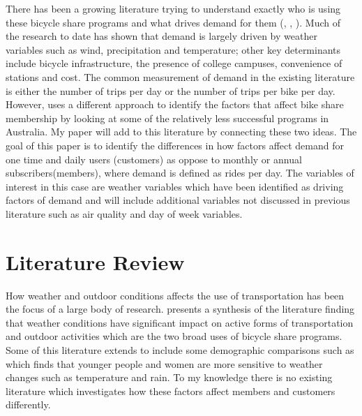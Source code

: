 \documentclass[12pt,letter paper]{article}
\begin{document}
There has been a growing literature trying to understand exactly who is using these bicycle share programs and what drives demand for them (\cite{fishman2013bike}, \cite{el2017effects}, \cite{mattson2017bike}).  Much of the research to date has shown that demand is largely driven by weather variables such as wind, precipitation and temperature; other key determinants include bicycle infrastructure, the presence of college campuses, convenience of stations and cost.  The common measurement of demand in the existing literature is either the number of trips per day or the number of trips per bike per day.  However, \cite{fishman2015factors} uses a different approach to identify the factors that affect bike share membership by looking at some of the relatively less successful programs in Australia.  My paper will add to this literature by connecting these two ideas.  The goal of this paper is to identify the differences in how factors affect demand for one time and daily users (customers) as oppose to monthly or annual subscribers(members), where demand is defined as rides per day.  The variables of interest in this case are weather variables which have been identified as driving factors of demand and will include additional variables not discussed in previous literature such as air quality and day of week variables.  \\





\section{Literature Review}

How weather and outdoor conditions affects the use of transportation has been the focus of a large body of research.  \cite{bocker2013impact} presents a synthesis of the literature finding that weather conditions have significant impact on active forms of transportation and outdoor activities which are the two broad uses of bicycle share programs.  Some of this literature extends to include some demographic comparisons such as \cite{saneinejad2012modelling} which finds that younger people and women are more sensitive to weather changes such as temperature and rain.  To my knowledge there is no existing literature which investigates how these factors affect members and customers differently. \\
\end{document}
